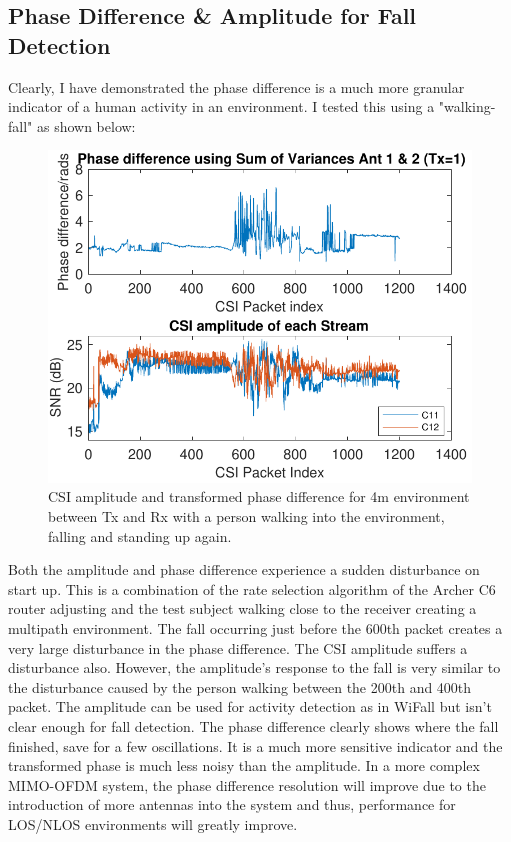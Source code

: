 \subsection{Phase Difference \& Amplitude for Fall Detection}
Clearly, I have demonstrated the phase difference is a much more granular indicator of a human activity in an environment. I tested this using a "walking-fall" as shown below:
\begin{figure}[H]
    \centering
    \includegraphics[scale=0.75]{Figures/subplotFall.pdf}
    \caption{CSI amplitude and transformed phase difference for 4m environment between Tx and Rx with a person walking into the environment, falling and standing up again. }
    \label{fig:finalPlot}
\end{figure}
Both the amplitude and phase difference experience a sudden disturbance on start up. This is a combination of the rate selection algorithm of the Archer C6 router adjusting and the test subject walking close to the receiver creating a multipath environment. The fall occurring just before the 600th packet creates a very large disturbance in the phase difference. The CSI amplitude suffers a disturbance also. However, the amplitude's response to the fall is very similar to the disturbance caused by the person walking between the 200th and 400th packet. The amplitude can be used for activity detection as in WiFall but isn't clear enough for fall detection. The phase difference clearly shows where the fall finished, save for a few oscillations. It is a much more sensitive indicator and the transformed phase is much less noisy than the amplitude. In a more complex MIMO-OFDM system, the phase difference resolution will improve due to the introduction of more antennas into the system and thus, performance for LOS/NLOS environments will greatly improve.